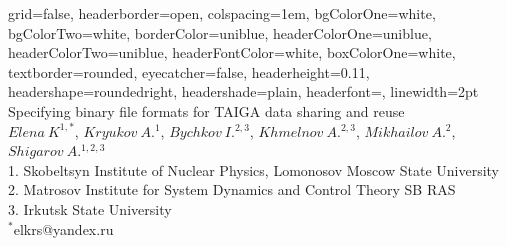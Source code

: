 \documentclass[a0paper,portrait]{baposter}
\begin{document}


\begin{poster}
{
grid=false,
headerborder=open, %
colspacing=1em, %
bgColorOne=white, %
bgColorTwo=white, %
borderColor=uniblue, %
headerColorOne=uniblue, %
headerColorTwo=uniblue, %
headerFontColor=white, %
boxColorOne=white, %
textborder=rounded, %
eyecatcher=false, %
headerheight=0.11\textheight, %
headershape=roundedright, %
headershade=plain,
headerfont=\Large\textsf, %
linewidth=2pt %
}
{}
%
%
{
\textsf %
{Specifying binary file formats for TAIGA data sharing and reuse
}
} 
{\sf\vspace{0em}\\
$Elena~K^{1,*}$, $Kryukov~A.^{1}$, $Bychkov~I.^{2,3}$, $Khmelnov~A.^{2,3}$, $Mikhailov~A.^{2}$, $Shigarov~A.^{1,2,3}$
\vspace{0.1em}\\
\small{1. Skobeltsyn Institute of Nuclear Physics, Lomonosov Moscow State University\\
2. Matrosov Institute for System Dynamics and Control Theory SB RAS\\
3. Irkutsk State University
\vspace{0.0em}\\
$^*$elkrs@yandex.ru}
}


\end{poster}
\end{document}
